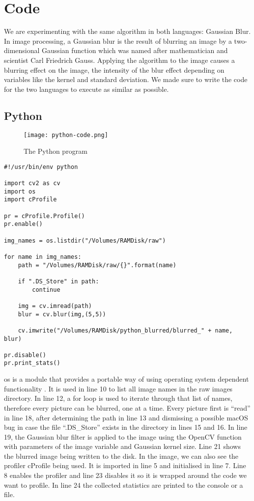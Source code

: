 \section{Code}
We are experimenting with the same algorithm in both languages: Gaussian Blur. In image processing, a Gaussian blur is the result of blurring an image by a two-dimensional Gaussian function which was named after mathematician and scientist Carl Friedrich Gauss. Applying the algorithm to the image causes a blurring effect on the image, the intensity of the blur effect depending on variables like the kernel and standard deviation. We made sure to write the code for the two languages to execute as similar as possible.

\subsection{Python}
\begin{figure}[htbp]
	\centering
	\texttt{[image: python-code.png]}
	\caption{The Python program}
	\label{figure:python-code}
\end{figure}

\begin{verbatim}
#!/usr/bin/env python

import cv2 as cv
import os
import cProfile

pr = cProfile.Profile()
pr.enable()

img_names = os.listdir("/Volumes/RAMDisk/raw")

for name in img_names:
    path = "/Volumes/RAMDisk/raw/{}".format(name)

    if ".DS_Store" in path:
        continue

    img = cv.imread(path)
    blur = cv.blur(img,(5,5))

    cv.imwrite("/Volumes/RAMDisk/python_blurred/blurred_" + name, blur)

pr.disable()
pr.print_stats()
\end{verbatim}

os is a module that provides a portable way of using operating system dependent functionality \cite{os}. It is used in line 10 to list all image names in the raw images directory. In line 12, a for loop is used to iterate through that list of names, therefore every picture can be blurred, one at a time. Every picture first is “read” in line 18, after determining the path in line 13 and dismissing a possible macOS bug in case the file “.DS\_Store” exists in the directory in lines 15 and 16. In line 19, the Gaussian blur filter is applied to the image using the OpenCV function with parameters of the image variable and Gaussian kernel size. Line 21 shows the blurred image being written to the disk.
In the image, we can also see the profiler cProfile being used. It is imported in line 5 and initialised in line 7. Line 8 enables the profiler and line 23 disables it so it is wrapped around the code we want to profile. In line 24 the collected statistics are printed to the console or a file.

